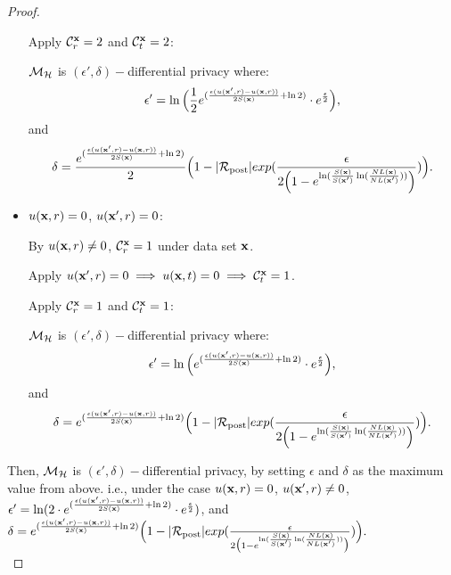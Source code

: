 \documentclass{article}
\begin{document}
\begin{proof}
\begin{itemize}
      Apply  $\mathcal{C}^{\textbf{x}}_{r} = 2$ and  $\mathcal{C}^{\textbf{x}}_{t} = 2$:

      $\mathcal{M}_{\mathcal{H}}$ is $(\epsilon', \delta)-$differential privacy where:
      $$
      \epsilon' = \ln \Big( \frac{1}{2} e^{(\frac{\epsilon (u(\textbf{x}', {r}) - u(\textbf{x}, {r}))}{2 S(\textbf{x})} + \ln 2)} \cdot e^{\frac{\epsilon}{2}} \Big),
      $$ and
      $$
      \delta = \frac{e^{(\frac{\epsilon (u(\textbf{x}', {r}) - u(\textbf{x}, {r}))}{2 S(\textbf{x})} + \ln 2)}}{2}
      \Big( 1 - |\mathcal{R}_{\textup{post}}|exp(\frac{\epsilon}{2 \Big( 1 - e ^ {\ln(\frac{S(\textbf{x})}{S(\textbf{x}')} \ln(\frac{NL(\textbf{x})}{NL(\textbf{x}')}))} \Big)}) \Big).
      $$ 

    \item {\boldmath$u(\textbf{x}, {r}) = 0$, $u(\textbf{x}', {r}) = 0$}:

      By $u(\textbf{x}, {r}) \neq 0$, $\mathcal{C}^{\textbf{x}}_{r} = 1$ under data set $\textbf{x}$.
      
      Apply $u(\textbf{x}', {r}) = 0 \implies u(\textbf{x}, {t}) = 0 \implies \mathcal{C}^{\textbf{x}}_{t} = 1$.

      Apply  $\mathcal{C}^{\textbf{x}}_{r} = 1$ and  $\mathcal{C}^{\textbf{x}}_{t} = 1$:

      $\mathcal{M}_{\mathcal{H}}$ is $(\epsilon', \delta)-$differential privacy where:
      $$
      \epsilon' = \ln \Big( e^{(\frac{\epsilon (u(\textbf{x}', {r}) - u(\textbf{x}, {r}))}{2 S(\textbf{x})} + \ln 2)} \cdot e^{\frac{\epsilon}{2}} \Big),
      $$ and
      $$
      \delta = e^{(\frac{\epsilon (u(\textbf{x}', {r}) - u(\textbf{x}, {r}))}{2 S(\textbf{x})} + \ln 2)}
      \Big( 1 - |\mathcal{R}_{\textup{post}}|exp(\frac{\epsilon}{2 \Big( 1 - e ^ {\ln(\frac{S(\textbf{x})}{S(\textbf{x}')} \ln(\frac{NL(\textbf{x})}{NL(\textbf{x}')}))} \Big)}) \Big).
      $$ 

  \end{itemize}

  
      Then, $\mathcal{M}_{\mathcal{H}}$ is $(\epsilon', \delta)-$differential privacy, by setting $\epsilon $ and $\delta$ as the maximum value from above.
      i.e., under the case {\boldmath$u(\textbf{x}, {r}) = 0$, $u(\textbf{x}', {r}) \neq 0$}, 
      $
      \epsilon' = \ln (2 \cdot e^{(\frac{\epsilon (u(\textbf{x}', {r}) - u(\textbf{x}, {r}))}{2 S(\textbf{x})} + \ln 2)} \cdot e^{\frac{\epsilon}{2}})
      $, and
      $
      \delta = e^{(\frac{\epsilon (u(\textbf{x}', {r}) - u(\textbf{x}, {r}))}{2 S(\textbf{x})} + \ln 2)}
      \Big( 1 - |\mathcal{R}_{\textup{post}}|exp(\frac{\epsilon}{2 \big(1 - e ^ {\ln(\frac{S(\textbf{x})}{S(\textbf{x}')} \ln(\frac{NL(\textbf{x})}{NL(\textbf{x}')}))} \big)}) \Big).
      $\\

\end{proof}



\end{document}
